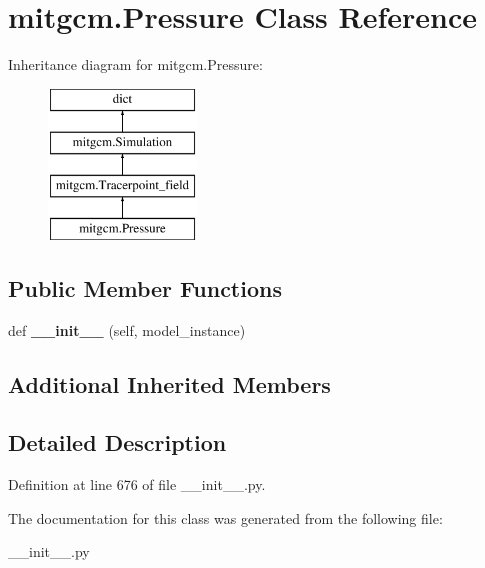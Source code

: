 \hypertarget{classmitgcm_1_1Pressure}{}\section{mitgcm.\+Pressure Class Reference}
\label{classmitgcm_1_1Pressure}
Inheritance diagram for mitgcm.\+Pressure\+:\begin{figure}[H]
\begin{center}
\leavevmode
\includegraphics[height=4.000000cm]{classmitgcm_1_1Pressure}
\end{center}
\end{figure}
\subsection*{Public Member Functions}
\begin{DoxyCompactItemize}
\item 
\hypertarget{classmitgcm_1_1Pressure_a8e6212466c20ab5369eb414d201b4a8f}{}def {\bfseries \+\_\+\+\_\+init\+\_\+\+\_\+} (self, model\+\_\+instance)\label{classmitgcm_1_1Pressure_a8e6212466c20ab5369eb414d201b4a8f}

\end{DoxyCompactItemize}
\subsection*{Additional Inherited Members}


\subsection{Detailed Description}


Definition at line 676 of file \+\_\+\+\_\+init\+\_\+\+\_\+.\+py.



The documentation for this class was generated from the following file\+:\begin{DoxyCompactItemize}
\item 
\+\_\+\+\_\+init\+\_\+\+\_\+.\+py\end{DoxyCompactItemize}
